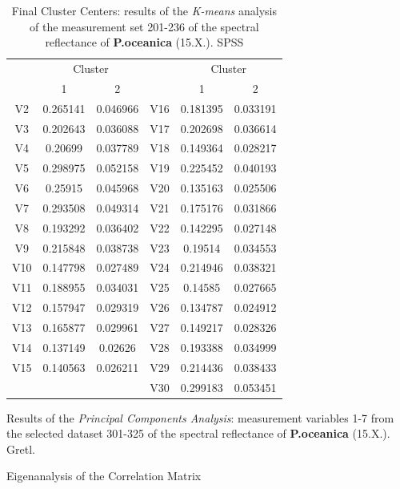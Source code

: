 \documentclass[10pt, a4paper]{article}
\begin{document}
\begin{appendices}
\begin{table}[htbp]
\caption{Final Cluster Centers: results of the \textit{K-means} analysis of the measurement set 201-236 of the spectral reflectance of \textbf{P.oceanica} (15.X.). SPSS}
\label{tab:16}
\begin{center}
\begin{tabular}{|c|c|c|c|c|c|}
\hline\hline
& \multicolumn{2}{|c|}{Cluster} &  & \multicolumn{2}{|c|}{Cluster}\\
 & 1 & 2 &  & 1 & 2 \\ \hline\hline
V2  &	0.265141 &	0.046966 &	V16 &	0.181395 &	0.033191 \\ \hline
V3 &	0.202643 &	0.036088 &	V17 &	0.202698 &	0.036614 \\ \hline
V4 &	0.20699 &	0.037789 &	V18 &	0.149364 &	0.028217 \\ \hline
V5 &	0.298975 &	0.052158 &	V19 &	0.225452 &	0.040193 \\ \hline
V6 &	0.25915 &	0.045968 &	V20 &	0.135163 &	0.025506 \\ \hline
V7 &	0.293508 &	0.049314 &	V21 &	0.175176 &	0.031866 \\ \hline
V8 &	0.193292 &	0.036402 &	V22 &	0.142295 &	0.027148 \\ \hline
V9 &	0.215848 &	0.038738 &	V23 &	0.19514 &	0.034553 \\ \hline
V10 &	0.147798 &	0.027489 &	V24 &	0.214946 &	0.038321 \\ \hline
V11 &	0.188955 &	0.034031 &	V25 &	0.14585 &	0.027665 \\ \hline
V12 &	0.157947 &	0.029319 &	V26 &	0.134787 &	0.024912 \\ \hline
V13 &	0.165877 &	0.029961 &	V27 &	0.149217 &	0.028326 \\ \hline
V14 &	0.137149 &	0.02626 &	V28 &	0.193388 &	0.034999 \\ \hline
V15 &	0.140563 &	0.026211 &	V29 &	0.214436 &	0.038433 \\ \hline
 &	 &	 &	V30	 & 0.299183	 & 0.053451 \\ \hline
\end{tabular}
\end{center}
\label{fig:5}
\end{table}

\begin{table}[H]
\caption{Results of the \textit{Principal Components Analysis}: measurement variables 1-7 from the selected dataset 301-325 of the spectral reflectance of \textbf{P.oceanica} (15.X.). Gretl.}
\begin{center}
Eigenanalysis of the Correlation Matrix\\
\vspace{1em}


\end{center}
\end{table}
\end{appendices}
\end{document}
